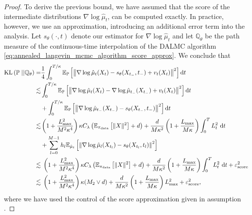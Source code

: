 \begin{proof}
To derive the previous bound, we have assumed that the score of the intermediate distributions $\nabla\log\hat{\mu}_t$, can be computed exactly. In practice, however, we use an approximation, introducing an additional error term into the analysis. Let $s_\theta(\cdot, t)$ denote our estimator for $\nabla\log\hat{\mu}_t$  and let $\mathbb{Q}_\theta$ be the path measure of the continuous-time interpolation of the \gls*{DALMC} algorithm \eqref{eq:annealed_langevin_mcmc_algorithm_score_approx}. We conclude that
\begin{align*}
    \operatorname*{KL}\left(\mathbb{P}\;||\mathbb{Q}_\theta\right)=& \frac{1}{4}\int_0^{T/\kappa}\mathbb{E}_{\mathbb{P}}\left[\left\Vert \nabla\log \hat{\mu}_t(X_t)- s_\theta(X_{t_-}, t_-) + v_t(X_t)\right\Vert^2\right]\mathrm{d} t\\
    \lesssim& \int_0^{T/\kappa}\mathbb{E}_{\mathbb{P}}\left[\left\Vert \nabla\log \hat{\mu}_t(X_t)-\nabla \log \hat{\mu}_{t_-}(X_{t_-}) + v_t(X_t)\right\Vert^2\right]\mathrm{d} t \\
    &+ \int_0^{T/\kappa}\mathbb{E}_{\mathbb{P}}\left[\left\Vert \nabla \log \hat{\mu}_{t_-}(X_{t_-}) - s_\theta(X_{t_-}, t_-)\right\Vert^2\right]\mathrm{d} t\\
    \lesssim& \left(1+\frac{L_{\max}^2}{M^2\kappa^4}\right) \kappa C_\lambda \left(\mathbb{E}_{\operatorname*{\pi_{\text{data}}}}\left[\Vert X\Vert^2\right] + d\right) + \frac{d}{M\kappa^2}\left(1+  \frac{L_{\max}}{M\kappa}\right)\int_{0}^{T}L_{ t}^2 \ \mathrm{d} t \\
    &+\sum_{l=0}^{M-1} h_l\mathbb{E}_{\hat{\mu}_t}\left[\left\Vert \nabla \log \hat{\mu}_l(X_{t_l}) - s_\theta(X_{t_l}, t_l)\right\Vert^2\right]\\
    \lesssim& \;\left(1+\frac{L_{\max}^2}{M^2\kappa^4}\right) \kappa C_\lambda \left(\mathbb{E}_{\operatorname*{\pi_{\text{data}}}}\left[\Vert X\Vert^2\right] + d\right) + \frac{d}{M\kappa^2}\left(1+  \frac{L_{\max}}{M\kappa}\right)\int_{0}^{T}L_{ t}^2 \ \mathrm{d} t + \varepsilon_{\text{score}}^2\\
    \lesssim& \;\left(1+\frac{L_{\max}^2}{M^2\kappa^4}\right) \kappa (M_2\vee d) + \frac{d}{M\kappa^2}\left(1+  \frac{L_{\max}}{M\kappa}\right)L_{\max}^2 + \varepsilon_{\text{score}}^2,
\end{align*}
where we have used the control of the score approximation given in assumption .
\end{proof}

